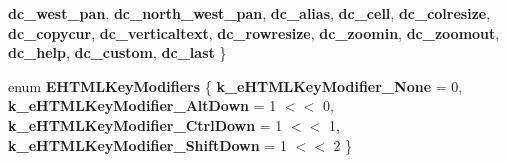 \begin{DoxyCompactItemize}
{\bfseries dc\+\_\+west\+\_\+pan}, 
{\bfseries dc\+\_\+north\+\_\+west\+\_\+pan}, 
{\bfseries dc\+\_\+alias}, 
\newline
{\bfseries dc\+\_\+cell}, 
{\bfseries dc\+\_\+colresize}, 
{\bfseries dc\+\_\+copycur}, 
{\bfseries dc\+\_\+verticaltext}, 
\newline
{\bfseries dc\+\_\+rowresize}, 
{\bfseries dc\+\_\+zoomin}, 
{\bfseries dc\+\_\+zoomout}, 
{\bfseries dc\+\_\+help}, 
\newline
{\bfseries dc\+\_\+custom}, 
{\bfseries dc\+\_\+last}
 \}
\item 
\mbox{\label{class_i_steam_h_t_m_l_surface_a099a4ad38c6f926829aceb4b13ca9124}} 
enum {\bfseries E\+H\+T\+M\+L\+Key\+Modifiers} \{ {\bfseries k\+\_\+e\+H\+T\+M\+L\+Key\+Modifier\+\_\+\+None} = 0, 
{\bfseries k\+\_\+e\+H\+T\+M\+L\+Key\+Modifier\+\_\+\+Alt\+Down} = 1 $<$$<$ 0, 
{\bfseries k\+\_\+e\+H\+T\+M\+L\+Key\+Modifier\+\_\+\+Ctrl\+Down} = 1 $<$$<$ 1, 
{\bfseries k\+\_\+e\+H\+T\+M\+L\+Key\+Modifier\+\_\+\+Shift\+Down} = 1 $<$$<$ 2
 \}
\end{DoxyCompactItemize}
